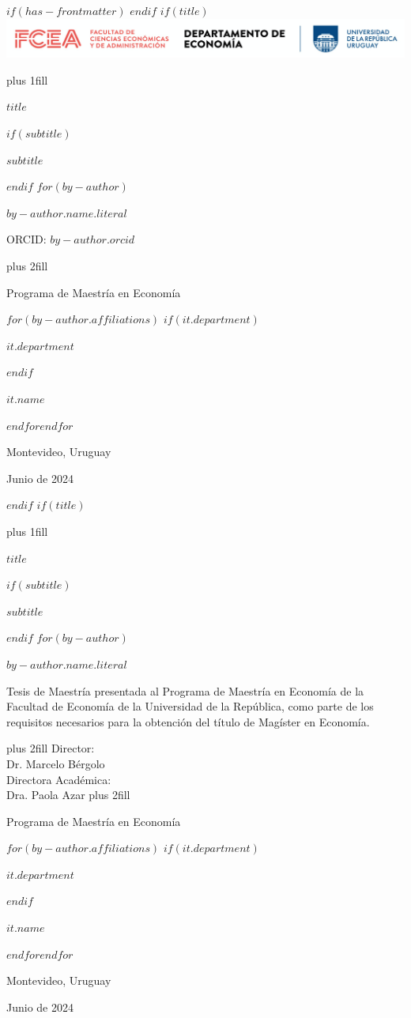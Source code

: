 $if(has-frontmatter)$
\frontmatter
$endif$
$if(title)$
\cleardoublepage
\thispagestyle{empty}
\includegraphics[width=\textwidth]{logo_udelar.png}
{\centering
\hbox{}\vskip 0cm plus 1fill
{\Huge\bfseries $title$ \par}
$if(subtitle)$
\vspace{3ex}
{\Large\bfseries $subtitle$ \par}
$endif$
\vspace{12ex}
$for(by-author)$
{\Large\bfseries $by-author.name.literal$ \par}
\vspace{3ex}
{ORCID: $by-author.orcid$ \par}
\vskip 0cm plus 2fill
{\large Programa de Maestría en Economía
\par}
$for(by-author.affiliations)$%
$if(it.department)$%
{\large $it.department$ \par}
$endif$%
{\large $it.name$ \par}
$endfor$$endfor$%
\vspace{3ex}
{\large Montevideo, Uruguay\par}
{\large Junio de 2024 \par}
\vspace{12ex}
{\small \par}
}
$endif$
$if(title)$
\cleardoublepage
\thispagestyle{empty}
{\centering
\hbox{}\vskip 0cm plus 1fill
{\Huge\bfseries $title$ \par}
$if(subtitle)$
\vspace{3ex}
{\Large\bfseries $subtitle$ \par}
$endif$
\vspace{12ex}
$for(by-author)$
{\Large\bfseries $by-author.name.literal$ \par}
\vspace{3ex}
}
{Tesis de Maestría presentada al Programa de Maestría en Economía de 
la Facultad de Economía de la Universidad de la República, como parte de los 
requisitos necesarios para la obtención del título de Magíster en Economía. 
\par}
{\centering
\vskip 0cm plus 2fill
{Director:\\Dr. Marcelo Bérgolo\\Directora Académica:\\Dra. Paola Azar}
\vskip 0cm plus 2fill
{\large Programa de Maestría en Economía
\par}
$for(by-author.affiliations)$%
$if(it.department)$%
{\large $it.department$ \par}
$endif$%
{\large $it.name$ \par}
$endfor$$endfor$%
\vspace{3ex}
{\large Montevideo, Uruguay\par}
{\large Junio de 2024 \par}
\vspace{12ex}
{\small \par}
}
